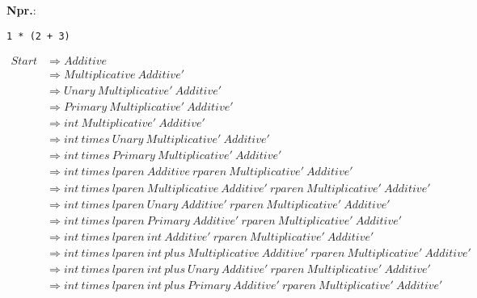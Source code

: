 \documentclass{report}
\newcommand{\Ex}{\textbf{Npr.}:\ }
\newcommand{\Spc}{\ }
\newcommand{\Derive}{\Rightarrow}
\newcommand{\NT}[1]{{#1}}
\newcommand{\T}[1]{{#1}}
\begin{document}
\newpage
\Ex
\begin{lstlisting}
1 * (2 + 3)
\end{lstlisting}
\begin{equation*}
  \begin{aligned}
    \NT{Start} &\Derive \NT{Additive}\\
    &\Derive \NT{Multiplicative} \Spc \NT{Additive'}\\
    &\Derive \NT{Unary} \Spc \NT{Multiplicative'} \Spc \NT{Additive'}\\
    &\Derive \NT{Primary} \Spc \NT{Multiplicative'} \Spc \NT{Additive'}\\
    &\Derive \T{int} \Spc \NT{Multiplicative'} \Spc \NT{Additive'}\\
    &\Derive \T{int} \Spc \T{times} \Spc \NT{Unary} \Spc \NT{Multiplicative'} \Spc \NT{Additive'}\\
    &\Derive \T{int} \Spc \T{times} \Spc \NT{Primary} \Spc \NT{Multiplicative'} \Spc \NT{Additive'}\\
    &\Derive \T{int} \Spc \T{times} \Spc \T{lparen} \Spc \NT{Additive} \Spc \T{rparen} \Spc \NT{Multiplicative'} \Spc \NT{Additive'}\\
    &\Derive \T{int} \Spc \T{times} \Spc \T{lparen} \Spc \NT{Multiplicative} \Spc \NT{Additive'} \Spc \T{rparen} \Spc \NT{Multiplicative'} \Spc \NT{Additive'}\\
    &\Derive \T{int} \Spc \T{times} \Spc \T{lparen} \Spc \NT{Unary} \Spc \NT{Additive'} \Spc \T{rparen} \Spc \NT{Multiplicative'} \Spc \NT{Additive'}\\
    &\Derive \T{int} \Spc \T{times} \Spc \T{lparen} \Spc \NT{Primary} \Spc \NT{Additive'} \Spc \T{rparen} \Spc \NT{Multiplicative'} \Spc \NT{Additive'}\\
    &\Derive \T{int} \Spc \T{times} \Spc \T{lparen} \Spc \T{int} \Spc \NT{Additive'} \Spc \T{rparen} \Spc \NT{Multiplicative'} \Spc \NT{Additive'}\\
    &\Derive \T{int} \Spc \T{times} \Spc \T{lparen} \Spc \T{int} \Spc \T{plus} \Spc \NT{Multiplicative} \Spc \NT{Additive'} \Spc \T{rparen} \Spc \NT{Multiplicative'} \Spc \NT{Additive'}\\
    &\Derive \T{int} \Spc \T{times} \Spc \T{lparen} \Spc \T{int} \Spc \T{plus} \Spc \NT{Unary} \Spc \NT{Additive'} \Spc \T{rparen} \Spc \NT{Multiplicative'} \Spc \NT{Additive'}\\
    &\Derive \T{int} \Spc \T{times} \Spc \T{lparen} \Spc \T{int} \Spc \T{plus} \Spc \NT{Primary} \Spc \NT{Additive'} \Spc \T{rparen} \Spc \NT{Multiplicative'} \Spc \NT{Additive'}\\

\end{aligned}
\end{equation*}
\end{document}
